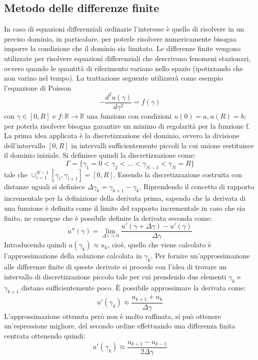\subsection{Metodo delle differenze finite}\label{appendix:diff}
In caso di equazioni differenziali ordinarie l'interesse è quello di risolvere in un preciso dominio, in particolare, per poterle risolvere numericamente bisogna imporre la condizione che il dominio sia limitato. Le differenze finite vengono utilizzate per risolvere equazioni differenziali che descrivono fenomeni stazionari, ovvero quando le quantità di riferimento variano nello spazio (ipotizzando che non varino nel tempo). La trattazione seguente utilizzerà come esempio l'equazione di Poisson
\begin{equation}
- \frac{d^2 u(\gamma)}{d\gamma^2}  =f(\gamma)
\end{equation}
con $\gamma\in[0,R]$ e $f:\mathbb{R}\rightarrow \mathbb{R}$ una funzione con condizioni $u(0)=a, u(R)=b$; per poterla risolvere bisogna garantire un minimo di regolarità per la funzione f. La prima idea applicata è la discretizzazione del dominio, ovvero la divisione dell'intervallo $[0,R]$ in intervalli sufficientemente piccoli la cui unione restituisce il dominio iniziale. Si definisce quindi la discretizzazione come:
\begin{equation}
\Gamma = \{\gamma_1 = 0 < \gamma_2 < \dots < \gamma_{N-1} < \gamma_N = R\}
\end{equation}
tale che $\cup_{i=1}^{N-1} [\gamma_i,\gamma_{i+1}] = [0,R]$. Essendo la discretizzazione costruita con distanze uguali si definisce $\Delta \gamma_k = \gamma_{k+1} -\gamma_k$. Riprendendo il concetto di rapporto incrementale per la definizione della derivata prima, sapendo che la derivata di una funzione è definita come il limite del rapporto incrementale in caso che sia finito, ne consegue che è possibile definire la derivata seconda come:
\begin{equation*}
u''(\gamma) = \lim_{\Delta\gamma \to 0} \frac{u'(\gamma+\Delta\gamma) -u'(\gamma)}{\Delta \gamma}
\end{equation*}
Introducendo quindi $u(\gamma_k) \approx u_k$, cioè, quello che viene calcolato è l'approssimazione della soluzione calcolata in $\gamma_k$. Per fornire un'approssimazione alle differenze finite di queste derivate si procede con l'idea di trovare un intervallo di discretizzazione piccolo tale per cui prendendo due elementi $\gamma_k$ e $\gamma_{k+1}$ distano sufficientemente poco. È possibile approssimare la derivata come:
\begin{equation}
u'(\gamma_k) \approx \frac{u_{k+1}+u_k}{\Delta \gamma}
\end{equation}
L'approssimazione ottenuta però non è molto raffinata, si può ottenere un'espressione migliore, del secondo ordine effettuando una differenza finita centrata ottenendo quindi:
\begin{equation}
u'(\gamma_k) \approx \frac{u_{k+1}-u_{k-1}}{2\Delta \gamma}
\end{equation}